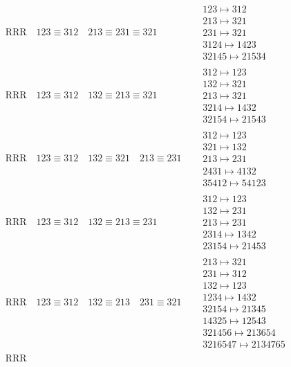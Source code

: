 \documentclass{article}
\begin{document}
\begin{align}
\text{RRR}
\quad
123\equiv312
\quad
213\equiv231\equiv321
\quad
&
\begin{matrix}
123 \mapsto 312
\\
213 \mapsto 321
\\
231 \mapsto 321
\\
3124 \mapsto 1423
\\
32145 \mapsto 21534
\end{matrix}
\\
\text{RRR}
\quad
123\equiv312
\quad
132\equiv213\equiv321
\quad
&
\begin{matrix}
312 \mapsto 123
\\
132 \mapsto 321
\\
213 \mapsto 321
\\
3214 \mapsto 1432
\\
32154 \mapsto 21543
\end{matrix}
\\
\text{RRR}
\quad
123\equiv312
\quad
132\equiv321
\quad
213\equiv231
\quad
&
\begin{matrix}
312 \mapsto 123
\\
321 \mapsto 132
\\
213 \mapsto 231
\\
2431 \mapsto 4132
\\
35412 \mapsto 54123
\end{matrix}
\\
\text{RRR}
\quad
123\equiv312
\quad
132\equiv213\equiv231
\quad
&
\begin{matrix}
312 \mapsto 123
\\
132 \mapsto 231
\\
213 \mapsto 231
\\
2314 \mapsto 1342
\\
23154 \mapsto 21453
\end{matrix}
\\
\text{RRR}
\quad
123\equiv312
\quad
132\equiv213
\quad
231\equiv321
\quad
&
\begin{matrix}
213 \mapsto 321
\\
231 \mapsto 312
\\
132 \mapsto 123
\\
1234 \mapsto 1432
\\
32154 \mapsto 21345
\\
14325 \mapsto 12543
\\
321456 \mapsto 213654
\\
3216547 \mapsto 2134765
\end{matrix}
\\
\text{RRR}

\end{align}
\end{document}
